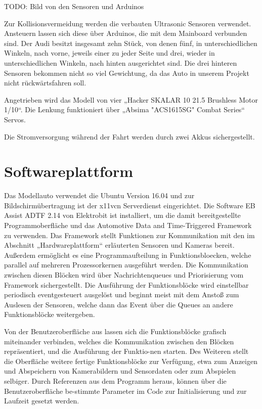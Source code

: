 \documentclass[12pt,a4paper]{report}
\begin{document}
TODO: Bild von den Sensoren und Arduinos

Zur Kollisionsvermeidung werden die verbauten Ultrasonic Sensoren verwendet. Ansteuern lassen sich diese über Arduinos, die mit 
dem Mainboard verbunden sind. Der Audi besitzt insgesamt zehn Stück, von denen fünf, in unterschiedlichen Winkeln, nach vorne, 
jeweils einer zu jeder Seite und drei, wieder in unterschiedlichen Winkeln, nach hinten ausgerichtet sind. Die drei hinteren 
Sensoren bekommen nicht so viel Gewichtung, da das Auto in unserem Projekt nicht rückwärtsfahren soll.

Angetrieben wird das Modell von vier „Hacker SKALAR 10 21.5 Brushless Motor 1/10“.
Die Lenkung funktioniert über „Absima "ACS1615SG" Combat Series“ Servos. 

Die Stromversorgung während der Fahrt werden durch zwei Akkus sichergestellt.


\section{Softwareplattform}
Das Modellauto verwendet die Ubuntu Version 16.04 und zur Bildschirmübertragung ist der x11vcn Serverdienst eingerichtet. Die 
Software EB Assist ADTF 2.14 von Elektrobit ist installiert, um die damit bereitgestellte Programmoberfläche und das Automotive 
Data and Time-Triggered Framework zu verwenden. Das Framework stellt Funktionen zur Kommunikation mit den im Abschnitt 
„Hardwareplattform“ erläuterten Sensoren und Kameras bereit. Außerdem ermöglicht es eine Programmaufteilung in Funktionsbloecken, welche parallel auf mehreren Prozessorkernen ausgeführt werden. Die Kommunikation zwischen diesen Blöcken wird über Nachrichtenqueues und Priorisierung vom Framework sichergestellt. Die Ausführung der Funktionsblöcke wird einstellbar periodisch eventgesteuert ausgelöst und beginnt meist mit dem Anstoß zum Auslesen der Sensoren, welche dann das Event über die Queues an andere Funktionsblöcke weitergeben.

Von der Benutzeroberfläche aus lassen sich die Funktionsblöcke grafisch miteinander verbinden, welches die Kommunikation zwischen den Blöcken repräsentiert, und die Ausführung der Funktio-nen starten. Des Weiteren stellt die Oberfläche weitere fertige Funktionsblöcke zur Verfügung, etwa zum Anzeigen und Abspeichern von Kamerabildern und Sensordaten oder zum  Abspielen selbiger.
Durch Referenzen aus dem Programm heraus, können über die Benutzeroberfläche be-stimmte Parameter im Code zur Initialisierung und zur Laufzeit gesetzt werden.
\end{document}
